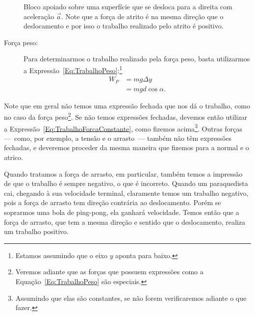 \begin{description}
\begin{marginfigure}
\caption{Bloco apoiado sobre uma superfície que se desloca para a direita com aceleração $\vec{a}$. Note que a força de atrito é na mesma direção que o deslocamento e por isso o trabalho realizado pelo atrito é positivo. \label{Fig:TrabalhoCorpoAceleradoPeloAtrito}}
\end{marginfigure}

    \item[Força peso:] Para determinarmos o trabalho realizado pela força peso, basta utilizarmos a Expressão~\eqref{Eq:TrabalhoPeso}:\footnote{Estamos assumindo que o eixo $y$ aponta para baixo.}
    \begin{align}
        W_P &= mg\Delta y \\
        &= mgd\cos\alpha.
    \end{align}
\end{description}

Note que em geral não temos uma expressão fechada que nos dá o trabalho, como no caso da força peso\footnote{Veremos adiante que as forças que possuem expressões como a Equação~\eqref{Eq:TrabalhoPeso} são especiais.}. Se não temos expressões fechadas, devemos então utilizar a Expressão~\eqref{Eq:TrabalhoForcaConstante}, como fizemos acima\footnote{Assumindo que elas são constantes, se não forem verificaremos adiante o que fazer.}. Outras forças ---~como, por exemplo, a tensão e o arrasto~--- também não têm expressões fechadas, e deveremos proceder da mesma maneira que fizemos para a normal e o atrico.

Quando tratamos a força de arrasto, em particular, também temos a impressão de que o trabalho é sempre negativo, o que é incorreto. Quando um paraquedista cai, chegando à sua velocidade terminal, claramente temos um trabalho negativo, pois a força de arrasto tem direção contrária ao deslocamento. Porém se soprarmos uma bola de ping-pong, ela ganhará velocidade. Temos então que a força de arrasto, que tem a mesma direção e sentido que o deslocamento, realiza um trabalho positivo.


